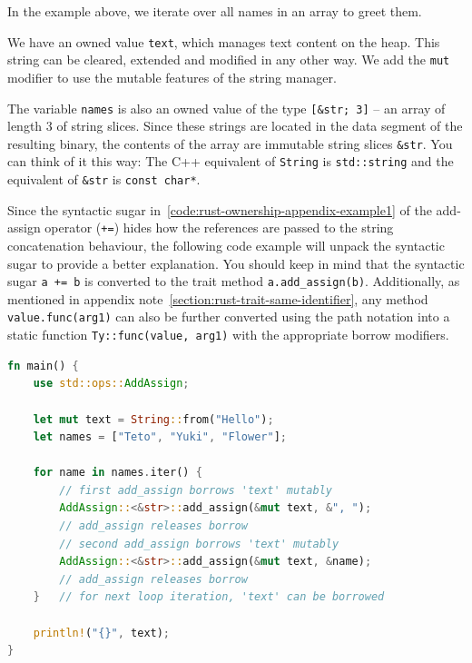 \documentclass[11pt,
               a4paper,
               bibtotoc,
               idxtotoc,
               headsepline,
               footsepline,
               footexclude,
               BCOR12mm,
               DIV13,
               openany,   %
               ]
               {scrbook}
\begin{document}
In the example above, we iterate over all names in an array to greet them.

We have an owned value \texttt{text}, which manages text content on the heap. This string can be cleared, extended and modified in any other way. We add the \texttt{mut} modifier to use the mutable features of the string manager.

The variable \texttt{names} is also an owned value of the type \texttt{[\&str; 3]} -- an array of length 3 of string slices. Since these strings are located in the data segment of the resulting binary, the contents of the array are immutable string slices \texttt{\&str}. You can think of it this way: The C++ equivalent of \texttt{String} is \texttt{std::string} and the equivalent of \texttt{\&str} is \texttt{const char*}.


Since the syntactic sugar in~\autoref{code:rust-ownership-appendix-example1} of the add-assign operator (\texttt{+=}) hides how the references are passed to the string concatenation behaviour, the following code example will unpack the syntactic sugar to provide a better explanation. You should keep in mind that the syntactic sugar \texttt{a += b} is converted to the trait method \texttt{a.add\_assign(b)}. Additionally, as mentioned in appendix note~\ref{section:rust-trait-same-identifier}, any method \texttt{value.func(arg1)} can also be further converted using the path notation into a static function \texttt{Ty::func(value, arg1)} with the appropriate borrow modifiers.

\vspace{0.5em}
\begin{lstlisting}[style=eclipse-rust, language=Rust, basicstyle=\ttfamily\small, label=code:rust-ownership-appendix-example2]
fn main() {
    use std::ops::AddAssign;

    let mut text = String::from("Hello");
    let names = ["Teto", "Yuki", "Flower"];

    for name in names.iter() {
        // first add_assign borrows 'text' mutably
        AddAssign::<&str>::add_assign(&mut text, &", ");
        // add_assign releases borrow
        // second add_assign borrows 'text' mutably
        AddAssign::<&str>::add_assign(&mut text, &name);
        // add_assign releases borrow
    }   // for next loop iteration, 'text' can be borrowed

    println!("{}", text);
}
\end{lstlisting}
\end{document}
